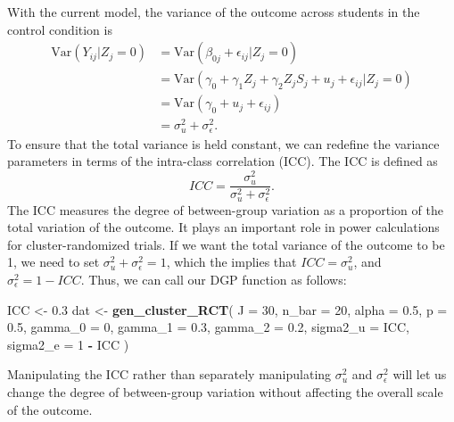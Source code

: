 \documentclass[
]{book}
\newenvironment{Shaded}{\begin{snugshade}}{\end{snugshade}}
\newcommand{\AttributeTok}[1]{\textcolor[rgb]{0.13,0.29,0.53}{#1}}
\newcommand{\DecValTok}[1]{\textcolor[rgb]{0.00,0.00,0.81}{#1}}
\newcommand{\FloatTok}[1]{\textcolor[rgb]{0.00,0.00,0.81}{#1}}
\newcommand{\FunctionTok}[1]{\textcolor[rgb]{0.13,0.29,0.53}{\textbf{#1}}}
\newcommand{\NormalTok}[1]{#1}
\newcommand{\OtherTok}[1]{\textcolor[rgb]{0.56,0.35,0.01}{#1}}
\newcommand{\SpecialCharTok}[1]{\textcolor[rgb]{0.81,0.36,0.00}{\textbf{#1}}}
\begin{document}
With the current model, the variance of the outcome across students in the control condition is
\[ 
\begin{aligned}
\text{Var}( Y_{ij} | Z_j = 0) &= \text{Var}( \beta_{0j} + \epsilon_{ij} | Z_j = 0) \\
&= \text{Var}( \gamma_{0} + \gamma_{1} Z_j + \gamma_{2} Z_j S_j + u_j + \epsilon_{ij} | Z_j = 0) \\
&= \text{Var}( \gamma_{0} + u_j + \epsilon_{ij} ) \\
&= \sigma^2_u + \sigma^2_\epsilon.
\end{aligned}
\]
To ensure that the total variance is held constant, we can redefine the variance parameters in terms of the intra-class correlation (ICC).
The ICC is defined as
\[ ICC = \frac{ \sigma^2_u }{ \sigma^2_u + \sigma^2_\epsilon }.\]
The ICC measures the degree of between-group variation as a proportion of the total variation of the outcome.
It plays an important role in power calculations for cluster-randomized trials.
If we want the total variance of the outcome to be 1, we need to set \(\sigma^2_u + \sigma^2_{\epsilon} = 1\), which the implies that \(ICC = \sigma^2_u\), and \(\sigma^2_\epsilon = 1 - ICC\).
Thus, we can call our DGP function as follows:

\begin{Shaded}
\begin{Highlighting}[]
\NormalTok{ICC }\OtherTok{\textless{}{-}} \FloatTok{0.3}
\NormalTok{dat }\OtherTok{\textless{}{-}} \FunctionTok{gen\_cluster\_RCT}\NormalTok{( }
  \AttributeTok{J =} \DecValTok{30}\NormalTok{, }\AttributeTok{n\_bar =} \DecValTok{20}\NormalTok{, }\AttributeTok{alpha =} \FloatTok{0.5}\NormalTok{, }\AttributeTok{p =} \FloatTok{0.5}\NormalTok{,}
  \AttributeTok{gamma\_0 =} \DecValTok{0}\NormalTok{, }\AttributeTok{gamma\_1 =} \FloatTok{0.3}\NormalTok{, }\AttributeTok{gamma\_2 =} \FloatTok{0.2}\NormalTok{,}
  \AttributeTok{sigma2\_u =}\NormalTok{ ICC, }\AttributeTok{sigma2\_e =} \DecValTok{1} \SpecialCharTok{{-}}\NormalTok{ ICC}
\NormalTok{)}
\end{Highlighting}
\end{Shaded}

Manipulating the ICC rather than separately manipulating \(\sigma^2_u\) and \(\sigma^2_\epsilon\) will let us change the degree of between-group variation without affecting the overall scale of the outcome.
\end{document}
